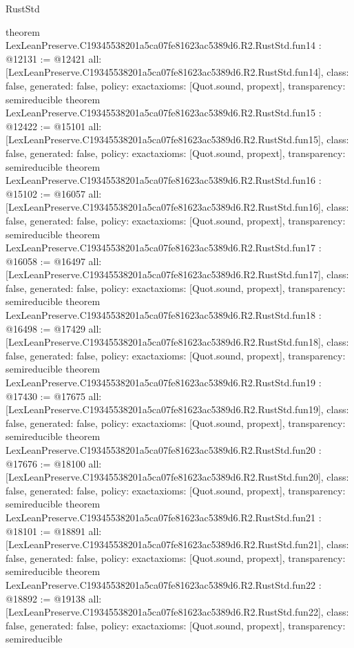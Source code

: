 \begin{lexlean}{RustStd}
\begin{coremodule}
{}
theorem LexLeanPreserve.C19345538201a5ca07fe81623ac5389d6.R2.RustStd.fun14 : @12131 := @12421 {
  all: [LexLeanPreserve.C19345538201a5ca07fe81623ac5389d6.R2.RustStd.fun14],
  class: false,
  generated: false,
  policy: exact{axioms: [Quot.sound, propext]},
  transparency: semireducible
}
theorem LexLeanPreserve.C19345538201a5ca07fe81623ac5389d6.R2.RustStd.fun15 : @12422 := @15101 {
  all: [LexLeanPreserve.C19345538201a5ca07fe81623ac5389d6.R2.RustStd.fun15],
  class: false,
  generated: false,
  policy: exact{axioms: [Quot.sound, propext]},
  transparency: semireducible
}
theorem LexLeanPreserve.C19345538201a5ca07fe81623ac5389d6.R2.RustStd.fun16 : @15102 := @16057 {
  all: [LexLeanPreserve.C19345538201a5ca07fe81623ac5389d6.R2.RustStd.fun16],
  class: false,
  generated: false,
  policy: exact{axioms: [Quot.sound, propext]},
  transparency: semireducible
}
theorem LexLeanPreserve.C19345538201a5ca07fe81623ac5389d6.R2.RustStd.fun17 : @16058 := @16497 {
  all: [LexLeanPreserve.C19345538201a5ca07fe81623ac5389d6.R2.RustStd.fun17],
  class: false,
  generated: false,
  policy: exact{axioms: [Quot.sound, propext]},
  transparency: semireducible
}
theorem LexLeanPreserve.C19345538201a5ca07fe81623ac5389d6.R2.RustStd.fun18 : @16498 := @17429 {
  all: [LexLeanPreserve.C19345538201a5ca07fe81623ac5389d6.R2.RustStd.fun18],
  class: false,
  generated: false,
  policy: exact{axioms: [Quot.sound, propext]},
  transparency: semireducible
}
theorem LexLeanPreserve.C19345538201a5ca07fe81623ac5389d6.R2.RustStd.fun19 : @17430 := @17675 {
  all: [LexLeanPreserve.C19345538201a5ca07fe81623ac5389d6.R2.RustStd.fun19],
  class: false,
  generated: false,
  policy: exact{axioms: [Quot.sound, propext]},
  transparency: semireducible
}
theorem LexLeanPreserve.C19345538201a5ca07fe81623ac5389d6.R2.RustStd.fun20 : @17676 := @18100 {
  all: [LexLeanPreserve.C19345538201a5ca07fe81623ac5389d6.R2.RustStd.fun20],
  class: false,
  generated: false,
  policy: exact{axioms: [Quot.sound, propext]},
  transparency: semireducible
}
theorem LexLeanPreserve.C19345538201a5ca07fe81623ac5389d6.R2.RustStd.fun21 : @18101 := @18891 {
  all: [LexLeanPreserve.C19345538201a5ca07fe81623ac5389d6.R2.RustStd.fun21],
  class: false,
  generated: false,
  policy: exact{axioms: [Quot.sound, propext]},
  transparency: semireducible
}
theorem LexLeanPreserve.C19345538201a5ca07fe81623ac5389d6.R2.RustStd.fun22 : @18892 := @19138 {
  all: [LexLeanPreserve.C19345538201a5ca07fe81623ac5389d6.R2.RustStd.fun22],
  class: false,
  generated: false,
  policy: exact{axioms: [Quot.sound, propext]},
  transparency: semireducible
}
\end{coremodule}
\end{lexlean}
